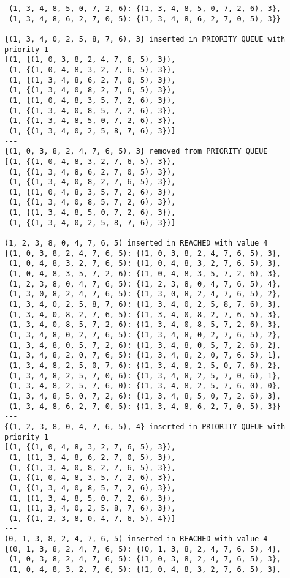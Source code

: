 \documentclass{article}
\begin{document}
\begin{verbatim}
 (1, 3, 4, 8, 5, 0, 7, 2, 6): {(1, 3, 4, 8, 5, 0, 7, 2, 6), 3},
 (1, 3, 4, 8, 6, 2, 7, 0, 5): {(1, 3, 4, 8, 6, 2, 7, 0, 5), 3}}
---
{(1, 3, 4, 0, 2, 5, 8, 7, 6), 3} inserted in PRIORITY QUEUE with priority 1
[(1, {(1, 0, 3, 8, 2, 4, 7, 6, 5), 3}),
 (1, {(1, 0, 4, 8, 3, 2, 7, 6, 5), 3}),
 (1, {(1, 3, 4, 8, 6, 2, 7, 0, 5), 3}),
 (1, {(1, 3, 4, 0, 8, 2, 7, 6, 5), 3}),
 (1, {(1, 0, 4, 8, 3, 5, 7, 2, 6), 3}),
 (1, {(1, 3, 4, 0, 8, 5, 7, 2, 6), 3}),
 (1, {(1, 3, 4, 8, 5, 0, 7, 2, 6), 3}),
 (1, {(1, 3, 4, 0, 2, 5, 8, 7, 6), 3})]
---
{(1, 0, 3, 8, 2, 4, 7, 6, 5), 3} removed from PRIORITY QUEUE
[(1, {(1, 0, 4, 8, 3, 2, 7, 6, 5), 3}),
 (1, {(1, 3, 4, 8, 6, 2, 7, 0, 5), 3}),
 (1, {(1, 3, 4, 0, 8, 2, 7, 6, 5), 3}),
 (1, {(1, 0, 4, 8, 3, 5, 7, 2, 6), 3}),
 (1, {(1, 3, 4, 0, 8, 5, 7, 2, 6), 3}),
 (1, {(1, 3, 4, 8, 5, 0, 7, 2, 6), 3}),
 (1, {(1, 3, 4, 0, 2, 5, 8, 7, 6), 3})]
---
(1, 2, 3, 8, 0, 4, 7, 6, 5) inserted in REACHED with value 4
{(1, 0, 3, 8, 2, 4, 7, 6, 5): {(1, 0, 3, 8, 2, 4, 7, 6, 5), 3},
 (1, 0, 4, 8, 3, 2, 7, 6, 5): {(1, 0, 4, 8, 3, 2, 7, 6, 5), 3},
 (1, 0, 4, 8, 3, 5, 7, 2, 6): {(1, 0, 4, 8, 3, 5, 7, 2, 6), 3},
 (1, 2, 3, 8, 0, 4, 7, 6, 5): {(1, 2, 3, 8, 0, 4, 7, 6, 5), 4},
 (1, 3, 0, 8, 2, 4, 7, 6, 5): {(1, 3, 0, 8, 2, 4, 7, 6, 5), 2},
 (1, 3, 4, 0, 2, 5, 8, 7, 6): {(1, 3, 4, 0, 2, 5, 8, 7, 6), 3},
 (1, 3, 4, 0, 8, 2, 7, 6, 5): {(1, 3, 4, 0, 8, 2, 7, 6, 5), 3},
 (1, 3, 4, 0, 8, 5, 7, 2, 6): {(1, 3, 4, 0, 8, 5, 7, 2, 6), 3},
 (1, 3, 4, 8, 0, 2, 7, 6, 5): {(1, 3, 4, 8, 0, 2, 7, 6, 5), 2},
 (1, 3, 4, 8, 0, 5, 7, 2, 6): {(1, 3, 4, 8, 0, 5, 7, 2, 6), 2},
 (1, 3, 4, 8, 2, 0, 7, 6, 5): {(1, 3, 4, 8, 2, 0, 7, 6, 5), 1},
 (1, 3, 4, 8, 2, 5, 0, 7, 6): {(1, 3, 4, 8, 2, 5, 0, 7, 6), 2},
 (1, 3, 4, 8, 2, 5, 7, 0, 6): {(1, 3, 4, 8, 2, 5, 7, 0, 6), 1},
 (1, 3, 4, 8, 2, 5, 7, 6, 0): {(1, 3, 4, 8, 2, 5, 7, 6, 0), 0},
 (1, 3, 4, 8, 5, 0, 7, 2, 6): {(1, 3, 4, 8, 5, 0, 7, 2, 6), 3},
 (1, 3, 4, 8, 6, 2, 7, 0, 5): {(1, 3, 4, 8, 6, 2, 7, 0, 5), 3}}
---
{(1, 2, 3, 8, 0, 4, 7, 6, 5), 4} inserted in PRIORITY QUEUE with priority 1
[(1, {(1, 0, 4, 8, 3, 2, 7, 6, 5), 3}),
 (1, {(1, 3, 4, 8, 6, 2, 7, 0, 5), 3}),
 (1, {(1, 3, 4, 0, 8, 2, 7, 6, 5), 3}),
 (1, {(1, 0, 4, 8, 3, 5, 7, 2, 6), 3}),
 (1, {(1, 3, 4, 0, 8, 5, 7, 2, 6), 3}),
 (1, {(1, 3, 4, 8, 5, 0, 7, 2, 6), 3}),
 (1, {(1, 3, 4, 0, 2, 5, 8, 7, 6), 3}),
 (1, {(1, 2, 3, 8, 0, 4, 7, 6, 5), 4})]
---
(0, 1, 3, 8, 2, 4, 7, 6, 5) inserted in REACHED with value 4
{(0, 1, 3, 8, 2, 4, 7, 6, 5): {(0, 1, 3, 8, 2, 4, 7, 6, 5), 4},
 (1, 0, 3, 8, 2, 4, 7, 6, 5): {(1, 0, 3, 8, 2, 4, 7, 6, 5), 3},
 (1, 0, 4, 8, 3, 2, 7, 6, 5): {(1, 0, 4, 8, 3, 2, 7, 6, 5), 3},

\end{verbatim}
\end{document}
